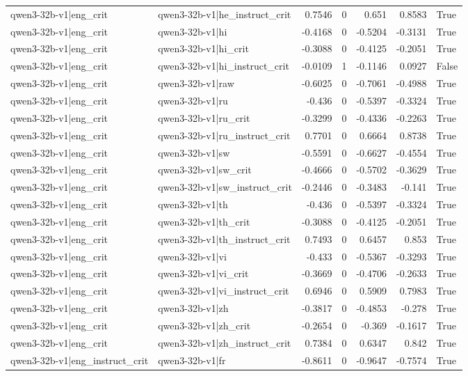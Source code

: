\begin{table}
\begin{tabular}{l l r r r r l}
qwen3-32b-v1|eng_crit & qwen3-32b-v1|he_instruct_crit & 0.7546 & 0 & 0.651 & 0.8583 & True \\
qwen3-32b-v1|eng_crit & qwen3-32b-v1|hi & -0.4168 & 0 & -0.5204 & -0.3131 & True \\
qwen3-32b-v1|eng_crit & qwen3-32b-v1|hi_crit & -0.3088 & 0 & -0.4125 & -0.2051 & True \\
qwen3-32b-v1|eng_crit & qwen3-32b-v1|hi_instruct_crit & -0.0109 & 1 & -0.1146 & 0.0927 & False \\
qwen3-32b-v1|eng_crit & qwen3-32b-v1|raw & -0.6025 & 0 & -0.7061 & -0.4988 & True \\
qwen3-32b-v1|eng_crit & qwen3-32b-v1|ru & -0.436 & 0 & -0.5397 & -0.3324 & True \\
qwen3-32b-v1|eng_crit & qwen3-32b-v1|ru_crit & -0.3299 & 0 & -0.4336 & -0.2263 & True \\
qwen3-32b-v1|eng_crit & qwen3-32b-v1|ru_instruct_crit & 0.7701 & 0 & 0.6664 & 0.8738 & True \\
qwen3-32b-v1|eng_crit & qwen3-32b-v1|sw & -0.5591 & 0 & -0.6627 & -0.4554 & True \\
qwen3-32b-v1|eng_crit & qwen3-32b-v1|sw_crit & -0.4666 & 0 & -0.5702 & -0.3629 & True \\
qwen3-32b-v1|eng_crit & qwen3-32b-v1|sw_instruct_crit & -0.2446 & 0 & -0.3483 & -0.141 & True \\
qwen3-32b-v1|eng_crit & qwen3-32b-v1|th & -0.436 & 0 & -0.5397 & -0.3324 & True \\
qwen3-32b-v1|eng_crit & qwen3-32b-v1|th_crit & -0.3088 & 0 & -0.4125 & -0.2051 & True \\
qwen3-32b-v1|eng_crit & qwen3-32b-v1|th_instruct_crit & 0.7493 & 0 & 0.6457 & 0.853 & True \\
qwen3-32b-v1|eng_crit & qwen3-32b-v1|vi & -0.433 & 0 & -0.5367 & -0.3293 & True \\
qwen3-32b-v1|eng_crit & qwen3-32b-v1|vi_crit & -0.3669 & 0 & -0.4706 & -0.2633 & True \\
qwen3-32b-v1|eng_crit & qwen3-32b-v1|vi_instruct_crit & 0.6946 & 0 & 0.5909 & 0.7983 & True \\
qwen3-32b-v1|eng_crit & qwen3-32b-v1|zh & -0.3817 & 0 & -0.4853 & -0.278 & True \\
qwen3-32b-v1|eng_crit & qwen3-32b-v1|zh_crit & -0.2654 & 0 & -0.369 & -0.1617 & True \\
qwen3-32b-v1|eng_crit & qwen3-32b-v1|zh_instruct_crit & 0.7384 & 0 & 0.6347 & 0.842 & True \\
qwen3-32b-v1|eng_instruct_crit & qwen3-32b-v1|fr & -0.8611 & 0 & -0.9647 & -0.7574 & True \\

\end{tabular}
\end{table}
